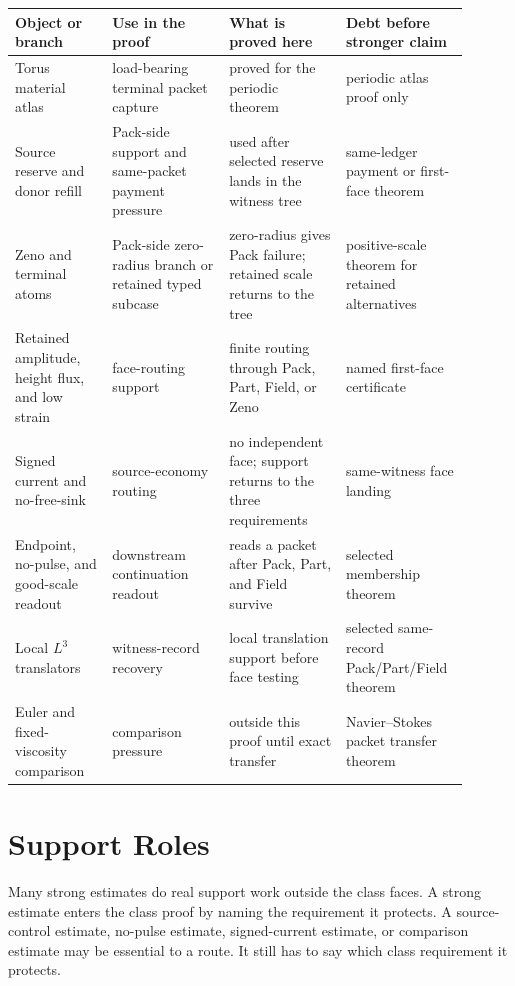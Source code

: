 \documentclass[11pt]{article}
\begin{document}
\begin{center}
\small
\setlength{\tabcolsep}{4pt}
\renewcommand{\arraystretch}{1.14}
\begin{tabular}{L{0.20\linewidth}L{0.24\linewidth}L{0.24\linewidth}L{0.22\linewidth}}
\textbf{Object or branch} & \textbf{Use in the proof} & \textbf{What is proved here} & \textbf{Debt before stronger claim}\\
\hline
Torus material atlas & load-bearing terminal packet capture & proved for the periodic theorem & periodic atlas proof only\\
Source reserve and donor refill & Pack-side support and same-packet payment pressure & used after selected reserve lands in the witness tree & same-ledger payment or first-face theorem\\
Zeno and terminal atoms & Pack-side zero-radius branch or retained typed subcase & zero-radius gives Pack failure; retained scale returns to the tree & positive-scale theorem for retained alternatives\\
Retained amplitude, height flux, and low strain & face-routing support & finite routing through Pack, Part, Field, or Zeno & named first-face certificate\\
Signed current and no-free-sink & source-economy routing & no independent face; support returns to the three requirements & same-witness face landing\\
Endpoint, no-pulse, and good-scale readout & downstream continuation readout & reads a packet after Pack, Part, and Field survive & selected membership theorem\\
Local \(L^3\) translators & witness-record recovery & local translation support before face testing & selected same-record Pack/Part/Field theorem\\
Euler and fixed-viscosity comparison & comparison pressure & outside this proof until exact transfer & Navier--Stokes packet transfer theorem\\
\end{tabular}
\end{center}

\section{Support Roles}

Many strong estimates do real support work outside the class faces.
A strong estimate enters the class proof by naming the requirement it protects.
A source-control estimate, no-pulse estimate, signed-current estimate, or comparison estimate may be essential to a route.
It still has to say which class requirement it protects.
\end{document}
